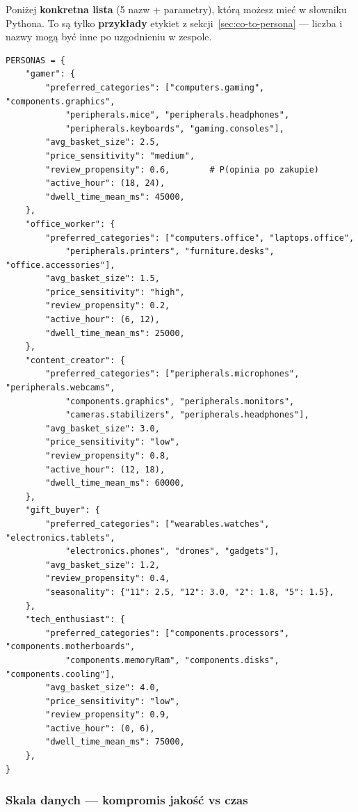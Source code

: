 \documentclass[a4paper,11pt]{article}
\begin{document}
Poniżej \textbf{konkretna lista} (5 nazw + parametry), którą możesz mieć w słowniku Pythona. To są tylko \textbf{przykłady} etykiet z sekcji~\ref{sec:co-to-persona} --- liczba i nazwy mogą być inne po uzgodnieniu w zespole.

\begin{lstlisting}
PERSONAS = {
    "gamer": {
        "preferred_categories": ["computers.gaming", "components.graphics",
            "peripherals.mice", "peripherals.headphones",
            "peripherals.keyboards", "gaming.consoles"],
        "avg_basket_size": 2.5,
        "price_sensitivity": "medium",
        "review_propensity": 0.6,        # P(opinia po zakupie)
        "active_hour": (18, 24),
        "dwell_time_mean_ms": 45000,
    },
    "office_worker": {
        "preferred_categories": ["computers.office", "laptops.office",
            "peripherals.printers", "furniture.desks", "office.accessories"],
        "avg_basket_size": 1.5,
        "price_sensitivity": "high",
        "review_propensity": 0.2,
        "active_hour": (6, 12),
        "dwell_time_mean_ms": 25000,
    },
    "content_creator": {
        "preferred_categories": ["peripherals.microphones", "peripherals.webcams",
            "components.graphics", "peripherals.monitors",
            "cameras.stabilizers", "peripherals.headphones"],
        "avg_basket_size": 3.0,
        "price_sensitivity": "low",
        "review_propensity": 0.8,
        "active_hour": (12, 18),
        "dwell_time_mean_ms": 60000,
    },
    "gift_buyer": {
        "preferred_categories": ["wearables.watches", "electronics.tablets",
            "electronics.phones", "drones", "gadgets"],
        "avg_basket_size": 1.2,
        "review_propensity": 0.4,
        "seasonality": {"11": 2.5, "12": 3.0, "2": 1.8, "5": 1.5},
    },
    "tech_enthusiast": {
        "preferred_categories": ["components.processors", "components.motherboards",
            "components.memoryRam", "components.disks", "components.cooling"],
        "avg_basket_size": 4.0,
        "price_sensitivity": "low",
        "review_propensity": 0.9,
        "active_hour": (0, 6),
        "dwell_time_mean_ms": 75000,
    },
}
\end{lstlisting}

\subsubsection{Skala danych --- kompromis jakość vs czas}
\end{document}
